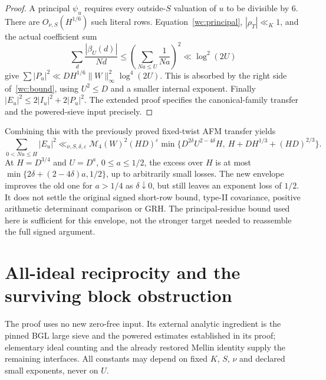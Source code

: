 \documentclass[11pt,oneside,openany]{book}
\theoremstyle{definition}\newtheorem{definition}[theorem]{Definition}
\theoremstyle{remark}\newtheorem{remark}[theorem]{Remark}
\begin{document}
\begin{proof}
A principal $\psi_u$ requires every outside-$S$ valuation of $u$ to
be divisible by $6$. There are $O_{\nu,S}(H^{1/6})$ such literal
rows. Equation~\eqref{wc:principal}, $|\rho_T|\ll_K1$, and the actual
coefficient sum
\[
 \sum_d\frac{|\beta_U(d)|}{Nd}
 \le\left(\sum_{Na\le U}\frac1{Na}\right)^2\ll\log^2(2U)
\]
give $\sum|P_u|^2\ll DH^{1/6}\|W\|_\infty^2\log^4(2U)$.
This is absorbed by the right side of~\eqref{wc:bound}, using
$U^2\le D$ and a smaller internal exponent. Finally
$|E_u|^2\le2|I_u|^2+2|P_u|^2$. The extended proof specifies the
canonical-family transfer and the powered-sieve input precisely.
\end{proof}

Combining this with the previously proved fixed-twist AFM transfer yields
\begin{equation}\label{wc:minimum}
 \sum_{0<Nu\le H}|E_u|^2\ll_{\nu,S,\delta,\varepsilon}
 \mathcal M_4(W)^2(HD)^\varepsilon
 \min\{D^{2\delta}U^{2-4\delta}H,\ H+DH^{1/3}+(HD)^{2/3}\}.
\end{equation}
At $H=D^{3/4}$ and $U=D^a$, $0\le a\le1/2$, the excess over $H$
is at most $\min\{2\delta+(2-4\delta)a,1/2\}$, up to arbitrarily
small losses. The new envelope improves the old one for $a>1/4$ as
$\delta\downarrow0$, but still leaves an exponent loss of $1/2$.
It does not settle the original signed short-row bound, type-II covariance,
positive arithmetic determinant comparison or GRH. The principal-residue
bound used here is sufficient for this envelope, not the stronger target
needed to reassemble the full signed argument.

\section{All-ideal reciprocity and the surviving block obstruction}
\label{wc:details}
The proof uses no new zero-free input. Its external analytic ingredient
is the pinned BGL large sieve and the powered estimates established in
its proof; elementary ideal counting and the already restored Mellin
identity supply the remaining interfaces. All constants may depend on
fixed $K$, $S$, $\nu$ and declared small exponents, never on $U$.
\end{document}
